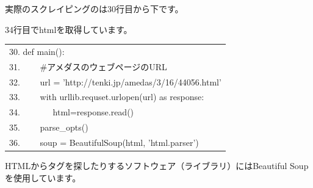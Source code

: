 \bigskip

\clearpage
実際のスクレイピングのは30行目から下です。

34行目でhtmlを取得しています。





\begin{table}[htbp]
    \centering
    \begin{tabular}{|l|}
        \hline
        
        30. def main():\\
        31. \ \ \ \ \#アメダスのウェブページのURL\\
        32. \ \ \ \ url = 'http://tenki.jp/amedas/3/16/44056.html'\\
        33. \ \ \ \ with urllib.requset.urlopen(url) as response:\\
        34. \ \ \ \ \ \ \ html=response.read()\\
        35. \ \ \ \ parse\_opts()\\
        36. \ \ \ \ soup = BeautifulSoup(html, 'html.parser')\\
        
        \hline
    \end{tabular}
\end{table}


HTMLからタグを探したりするソフトウェア（ライブラリ）にはBeautiful
Soupを使用しています。

